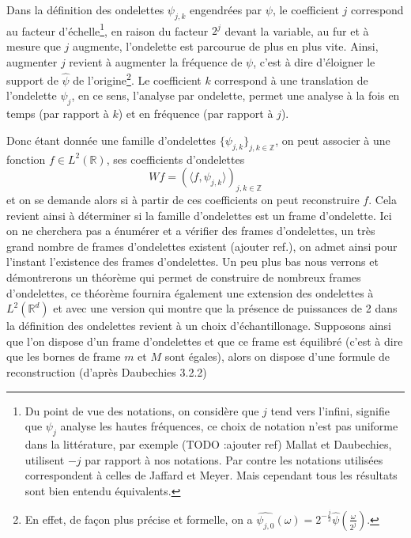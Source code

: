 \begin{remarque}
	Dans la définition des ondelettes $\psi_{j,k}$ engendrées par $\psi$, le coefficient $j$ correspond au facteur d'échelle\footnote{Du point de vue des notations, on considère que $j$ tend vers l'infini, signifie que $\psi_j$ analyse les hautes fréquences, ce choix de notation n'est pas uniforme dans la littérature, par exemple (TODO :ajouter ref) Mallat et Daubechies, utilisent $-j$ par rapport à nos notations. Par contre les notations utilisées correspondent à celles de Jaffard et Meyer. Mais cependant tous les résultats sont bien entendu équivalents.},
	en raison du facteur $2^j$ devant la variable, au fur et à mesure que $j$ augmente, l'ondelette est parcourue de plus en plus vite. Ainsi, augmenter $j$ revient à augmenter la fréquence de $\psi$, c'est à dire d'éloigner le support de $\hat{\psi}$ de l'origine\footnote{En effet, de façon plus précise et formelle, on a $\hat{\psi_{j,0}}(\omega) = 2^{-\frac{j}{2}}\hat{\psi}(\frac{\omega}{2^j})$.}.
	Le coefficient $k$ correspond à une translation de l'ondelette $\psi_j$, en ce sens, l'analyse par ondelette, permet une analyse à la fois en temps (par rapport à $k$) et en fréquence (par rapport à $j$).
\end{remarque}
Donc étant donnée une famille d'ondelettes $\{\psi_{j,k}\}_{j,k \in \mathbb{Z}}$, on peut associer à une fonction $f\in L^2(\mathbb{R})$, ses coefficients d'ondelettes
\begin{equation}
	Wf = (\langle f, \psi_{j,k} \rangle )_{j,k \in \mathbb{Z}}
\end{equation}
et on se demande alors si à partir de ces coefficients on peut reconstruire $f$.
Cela revient ainsi à déterminer si la famille d'ondelettes est un frame d'ondelette. 
Ici on ne cherchera pas a énumérer et a vérifier des frames d'ondelettes, un très grand nombre de frames d'ondelettes existent (ajouter ref.), on admet ainsi pour l'instant l'existence des frames d'ondelettes.
Un peu plus bas nous verrons et démontrerons un théorème qui permet de construire de nombreux frames d'ondelettes, ce théorème fournira également une extension des ondelettes à $L^2(\mathbb{R}^d)$ et avec une version qui montre que la présence de puissances de 2 dans la définition des ondelettes revient à un choix d'échantillonage. 
\newline
Supposons ainsi que l'on dispose d'un frame d'ondelettes et que ce frame est équilibré (c'est à dire que les bornes de frame $m$ et $M$ sont égales), alors on dispose d'une formule de reconstruction (d'après Daubechies 3.2.2)
